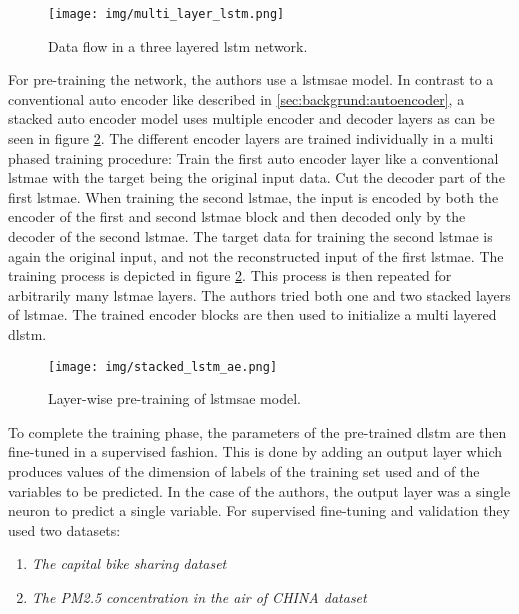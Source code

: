 \begin{figure}[]
	\centering
	\texttt{[image: img/multi\_layer\_lstm.png]}
	\caption{Data flow in a three layered \gls{lstm} network.}
	\label{fig:stateofart:unsupervised_learning_with_lstms_dlstm}
\end{figure}

For pre-training the network, the authors use a \gls{lstmsae} model. In contrast to a conventional auto encoder like described in \ref{sec:backgrund:autoencoder}, a stacked auto encoder model uses multiple encoder and decoder layers as can be seen in figure \ref{fig:stateofart:unsupervised_learning_dlstm_mts_lstmsae}. The different encoder layers are trained individually in a multi phased training procedure: Train the first auto encoder layer like a conventional \gls{lstmae} with the target being the original input data. Cut the decoder part of the first \gls{lstmae}. When training the second \gls{lstmae}, the input is encoded by both the encoder of the first and second \gls{lstmae} block and then decoded only by the decoder of the second \gls{lstmae}. The target data for training the second \gls{lstmae} is again the original input, and not the reconstructed input of the first \gls{lstmae}. The training process is depicted in figure \ref{fig:stateofart:unsupervised_learning_dlstm_mts_lstmsae}. This process is then repeated for arbitrarily many \gls{lstmae} layers. The authors tried both one and two stacked layers of \gls{lstmae}. The trained encoder blocks are then used to initialize a multi layered \gls{dlstm}.

\begin{figure}[]
	\centering
	\texttt{[image: img/stacked\_lstm\_ae.png]}
	\caption{Layer-wise pre-training of \gls{lstmsae} model. \cite{unsupervised_learning_lstms_timeseries}}
	\label{fig:stateofart:unsupervised_learning_dlstm_mts_lstmsae}
\end{figure}

To complete the training phase, the parameters of the pre-trained \gls{dlstm} are then fine-tuned in a supervised fashion. This is done by adding an output layer which produces values of the dimension of labels of the training set used and of the variables to be predicted. In the case of the authors, the output layer was a single neuron to predict a single variable. For supervised fine-tuning and validation they used two datasets:

\begin{enumerate}
	\item \textit{The capital bike sharing dataset}
	\item \textit{The PM2.5 concentration in the air of CHINA dataset}
\end{enumerate}

